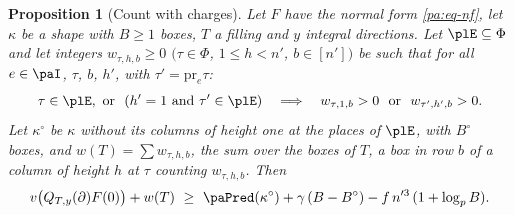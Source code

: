 \documentclass[10pt]{amsart}
\newtheorem{proposition}[theorem]{Proposition}
\theoremstyle{definition}
\theoremstyle{remark}
\providecommand{\auPl}{\Phi}
\begin{document}
\begin{proposition}[Count with charges]\label{pl:charges}
Let $F$ have the normal form \eqref{pa:eq-nf}, let $\kappa$ be a shape with $B\ge1$ boxes, $T$ a
filling and $y$ integral directions. Let $\plE\subseteq\auPl$ and let integers $w_{\tau,h,b}\ge0$
$(\tau\in\auPl$, $1\le h<n'$, $b\in[n'])$ be such that for all $e\in\paI$, $\tau$, $b$, $h'$, with
$\tau'=\mathrm{pr}_e\tau$:
\begin{equation}\label{pl:eq-chargehyp}
\tau\in\plE,\ \text{or}\ \ (h'=1\ \text{and}\ \tau'\in\plE)\quad\Longrightarrow\quad
w_{\tau,1,b}>0\ \ \text{or}\ \ w_{\tau',h',b}>0 .
\end{equation}
Let $\kappa^\circ$ be $\kappa$ without its columns of height one at the places of $\plE$, with
$B^\circ$ boxes, and $w(T)=\sum w_{\tau,h,b}$, the sum over the boxes of $T$, a box in row $b$ of a
column of height $h$ at $\tau$ counting $w_{\tau,h,b}$. Then
\[
v\bigl(Q_{T,y}(\partial)F(0)\bigr)+w(T)\ \ge\ \paPred(\kappa^\circ)+\gamma\,(B-B^\circ)-f\,n'^3\,
(1+\log_pB).
\]
\end{proposition}
\end{document}

